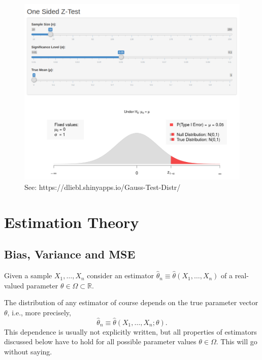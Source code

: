 \documentclass[]{book}
\theoremstyle{definition}
\theoremstyle{definition}
\theoremstyle{definition}
\theoremstyle{remark}
\begin{document}
\begin{figure}

{\centering \includegraphics{img/Gauss-Test-Distr} 

}

\caption{See: https://dliebl.shinyapps.io/Gauss-Test-Distr/}\label{fig:unnamed-chunk-10}
\end{figure}

\hypertarget{estimation-theory}{%
\chapter{Estimation Theory}\label{estimation-theory}}

\hypertarget{bias-variance-and-mse}{%
\section{Bias, Variance and MSE}\label{bias-variance-and-mse}}

Given a sample \(X_1,\dots,X_n\) consider an estimator \(\widehat{\theta}_n\equiv\widehat{\theta}(X_1,\dots,X_n)\) of a real-valued parameter \(\theta\in\Omega\subset\mathbb{R}\).

The distribution of any estimator of course depends on the true parameter vector \(\theta\), i.e., more precisely, \[\widehat{\theta}_n\equiv \widehat{\theta}(X_1,\dots,X_n;\theta).\]
This dependence is usually not explicitly written, but all properties of estimators discussed below have to hold for all possible parameter values \(\theta\in\Omega\). This will go without saying.
\end{document}
